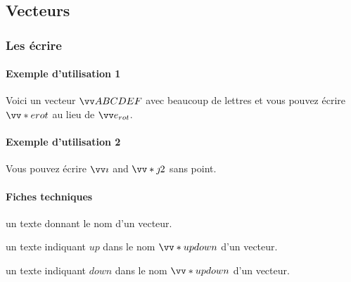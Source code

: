 \documentclass[12pt,a4paper]{article}
\begin{document}

\subsection{Vecteurs}

\subsubsection{Les écrire}

\paragraph{Exemple d'utilisation 1}

\begin{tcblisting}{}
Voici un vecteur $\vect{ABCDEF}$ avec beaucoup de lettres et vous pouvez écrire
$\vect*{e}{rot}$ au lieu de $\vect{e_{rot}}$.
\end{tcblisting}


\paragraph{Exemple d'utilisation 2}

\begin{tcblisting}{}
Vous pouvez écrire $\vect{i}$ and $\vect*{j}{2}$ sans point.
\end{tcblisting}



\paragraph{Fiches techniques}


\IDarg{} un texte donnant le nom d'un vecteur.


\bigskip



 un texte indiquant $up$ dans le nom $\vect*{up}{down}$ d'un vecteur.

 un texte indiquant $down$ dans le nom $\vect*{up}{down}$ d'un vecteur.
\end{document}
